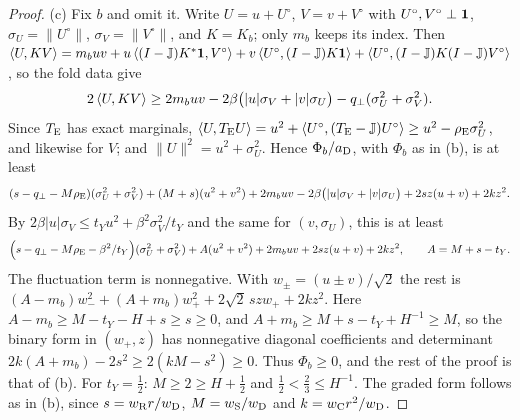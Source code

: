 \begin{proof}
(c) Fix $b$ and omit it. Write $U=u+U^\circ$, $V=v+V^\circ$ with
$U^\circ,V^\circ\perp\one$, $\sigma_U=\|U^\circ\|$, $\sigma_V=\|V^\circ\|$, and
$K=K_b$; only $m_b$ keeps its index. Then
$\ip U{KV}=m_buv+u\ip{(I-\Jproj)K^*\one}{V^\circ}+v\ip{U^\circ}{(I-\Jproj)K\one}
+\ip{U^\circ}{(I-\Jproj)K(I-\Jproj)V^\circ}$, so the fold data give
\[
 2\ip U{KV}\ge2m_buv-2\beta\bigl(|u|\sigma_V+|v|\sigma_U\bigr)
 -q_\perp(\sigma_U^2+\sigma_V^2).
\]
Since $T_{\rm E}$ has exact marginals,
$\ip U{T_{\rm E}U}=u^2+\ip{U^\circ}{(T_{\rm E}-\Jproj)U^\circ}\ge u^2-\rho_{\rm E}\sigma_U^2$,
and likewise for $V$; and $\|U\|^2=u^2+\sigma_U^2$. Hence $\Phi_b/a_{\rm D}$, with
$\Phi_b$ as in (b), is at least
\[
 (s-q_\perp-M\rho_{\rm E})(\sigma_U^2+\sigma_V^2)+(M+s)(u^2+v^2)+2m_buv
 -2\beta\bigl(|u|\sigma_V+|v|\sigma_U\bigr)+2sz(u+v)+2kz^2 .
\]
By $2\beta|u|\sigma_V\le t_Yu^2+\beta^2\sigma_V^2/t_Y$ and the same
for $(v,\sigma_U)$, this is at least
\[
 \Bigl(s-q_\perp-M\rho_{\rm E}-\frac{\beta^2}{t_Y}\Bigr)(\sigma_U^2+\sigma_V^2)
 +A(u^2+v^2)+2m_buv+2sz(u+v)+2kz^2,\qquad A=M+s-t_Y.
\]
The fluctuation term is nonnegative. With $w_\pm=(u\pm v)/\sqrt2$ the rest is
$(A-m_b)w_-^2+(A+m_b)w_+^2+2\sqrt2\,szw_++2kz^2$. Here
$A-m_b\ge M-t_Y-H+s\ge s\ge0$, and $A+m_b\ge M+s-t_Y+H^{-1}\ge M$, so
the binary form in $(w_+,z)$ has nonnegative diagonal coefficients and
determinant $2k(A+m_b)-2s^2\ge2(kM-s^2)\ge0$. Thus $\Phi_b\ge0$, and the rest of
the proof is that of (b). For $t_Y=\frac12$: $M\ge2\ge H+\frac12$ and
$\frac12<\frac23\le H^{-1}$. The graded form follows as in (b), since
$s=w_{\rm R}r/w_{\rm D}$, $M=w_{\rm S}/w_{\rm D}$ and $k=w_{\rm C}r^2/w_{\rm D}$.


\end{proof}
